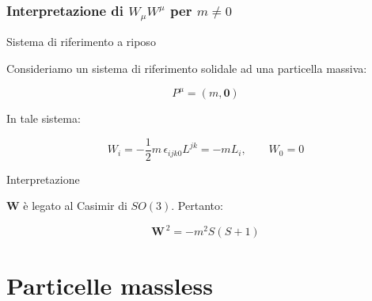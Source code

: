 \documentclass[11pt,t,aspectratio=169]{beamer}
\begin{document}
\begin{frame}[c]
    \frametitle{Interpretazione di $W_\mu W^\mu$ per $m\neq0$}

    \begin{block}{Sistema di riferimento a riposo}

        Consideriamo un sistema di riferimento solidale ad una
        particella massiva:

        \[
            P^\mu=(m,\mathbf{0})
        \]

        In tale sistema:

        \[
            W_i
            =
            -\frac{1}{2}
            m\,\epsilon_{ijk0}L^{jk}
            =
            -mL_i,
            \qquad
            W_0=0
        \]

    \end{block}

    \begin{exampleblock}{Interpretazione}

        $\mathbf{W}$ è legato al Casimir di $SO(3)$. Pertanto:

        \[
            \mathbf{W}^{\,2}
            =
            -m^2 S(S+1)
        \]

    \end{exampleblock}

\end{frame}


\section{Particelle massless}
\end{document}
